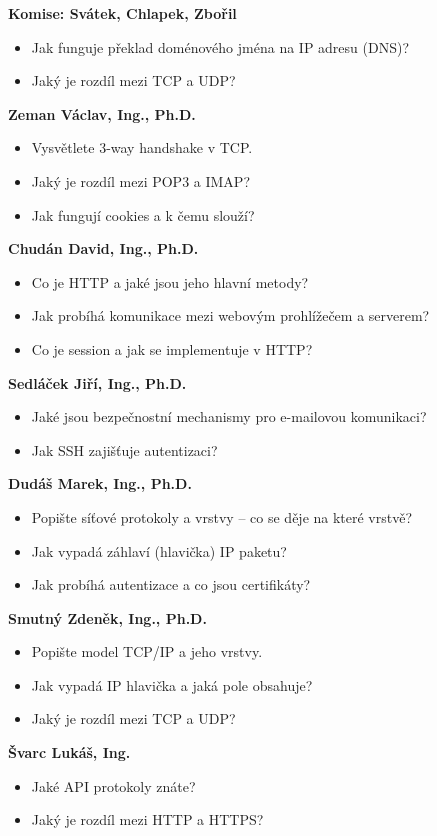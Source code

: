 \begin{profesorbox}
\textbf{Komise: Svátek, Chlapek, Zbořil}
\begin{itemize}
  \item Jak funguje překlad doménového jména na IP adresu (DNS)?
  \item Jaký je rozdíl mezi TCP a UDP?
\end{itemize}
\textbf{Zeman Václav, Ing., Ph.D.}
\begin{itemize}
  \item Vysvětlete 3-way handshake v TCP.
  \item Jaký je rozdíl mezi POP3 a IMAP?
  \item Jak fungují cookies a k čemu slouží?
\end{itemize}
\textbf{Chudán David, Ing., Ph.D.}
\begin{itemize}
  \item Co je HTTP a jaké jsou jeho hlavní metody?
  \item Jak probíhá komunikace mezi webovým prohlížečem a serverem?
  \item Co je session a jak se implementuje v HTTP?
\end{itemize}
\textbf{Sedláček Jiří, Ing., Ph.D.}
\begin{itemize}
  \item Jaké jsou bezpečnostní mechanismy pro e-mailovou komunikaci?
  \item Jak SSH zajišťuje autentizaci?
\end{itemize}
\textbf{Dudáš Marek, Ing., Ph.D.}
\begin{itemize}
  \item Popište síťové protokoly a vrstvy -- co se děje na které vrstvě?
  \item Jak vypadá záhlaví (hlavička) IP paketu?
  \item Jak probíhá autentizace a co jsou certifikáty?
\end{itemize}
\textbf{Smutný Zdeněk, Ing., Ph.D.}
\begin{itemize}
  \item Popište model TCP/IP a jeho vrstvy.
  \item Jak vypadá IP hlavička a jaká pole obsahuje?
  \item Jaký je rozdíl mezi TCP a UDP?
\end{itemize}
\textbf{Švarc Lukáš, Ing.}
\begin{itemize}
  \item Jaké API protokoly znáte?
  \item Jaký je rozdíl mezi HTTP a HTTPS?

\end{itemize}
\end{profesorbox}

